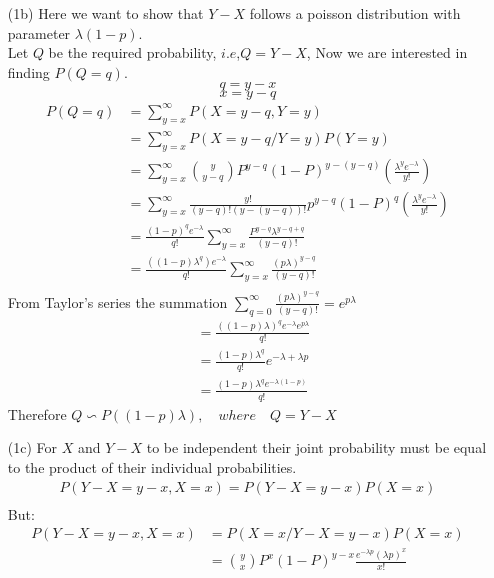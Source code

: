 \documentclass[12pt,a4paper]{article}
\begin{document}
\begin{itemize}
\newpage
\item[(1b)]Here we want to show that $Y-X$ follows a poisson distribution with parameter $\lambda\left(1-p\right)$.\\
Let $Q$ be the required probability, $i.e$,\quad$Q=Y-X$, Now we are interested in finding $P\left(Q=q\right)$.
$$q=y-x$$
$$x=y-q$$
\begin{align*}
P\left(Q=q\right)&=\sum _{y=x}^{\infty} P\left(X=y-q, Y=y\right)\\
&=\sum _{y=x}^{\infty} P\left(X=y-q/ Y=y\right)P\left(Y=y\right)\\
&=\sum _{y=x}^{\infty}{y \choose y-q}  P^{y-q} \left(1-P \right) ^{y-\left(y- q\right)} \left(\frac{\lambda ^{y}e^{-\lambda}}{y!}\right)\\
&=\sum _{y=x}^{\infty} \frac{y!}{\left(y-q\right)!\left(y-\left(y-q\right)\right)!}p^{y-q} \left(1-P \right) ^{q}\left(\frac{\lambda ^{y}e^{-\lambda}}{y!}\right)\\
&=\frac{\left(1-p\right) ^{q} e^ {-\lambda}}{q!}\sum _{y=x}^{\infty}\frac{P^{y-q}\lambda ^{y-q+q}}{\left(y-q\right) !}\\
&=\frac{\left(\left(1-p\right) \lambda ^{q}\right) e^{-\lambda}}{q!}\sum _{y=x}^{\infty} \frac{\left(p \lambda\right)^{y-q}}{\left(y-q\right)!}\\
\end{align*}
From Taylor's series the summation $\sum _{q=0}^{\infty} \frac{\left(p \lambda\right)^{y-q}}{\left(y-q\right)!}=e^{p\lambda}$
\begin{align*}
&=\frac{\left(\left(1-p\right)\lambda\right)^{q} e^ {-\lambda} e^ {p \lambda}}{q!} \\
&=\frac{\left(1-p\right)\lambda^{q}}{q!} e^{-\lambda+\lambda p}\\
&=\frac{\left(1-p\right)\lambda^{q}e^{ -\lambda\left(1-p\right)}}{q!} 
\end{align*}
Therefore $Q\backsim P\left(\left(1-p\right)\lambda\right),\quad where \quad Q=Y-X$
\newpage
\item[(1c)] For $X$ and $Y-X$ to be independent their joint probability must be equal to the product of their individual probabilities.\\
\begin{align*}
P(Y-X=y-x,X=x)=P(Y-X=y-x)P(X=x)\\
\end{align*}
But:
\begin{align}
P(Y-X=y-x,X=x)&=P\left(X=x/Y-X=y-x\right)P\left(X=x \right)\\
&={y \choose x}  P^{x} \left(1-P \right) ^{y-x} \frac{e^{-\lambda p}\left(\lambda p\right)^{x}}{x!}

\end{align}
\end{itemize}
\end{document}
